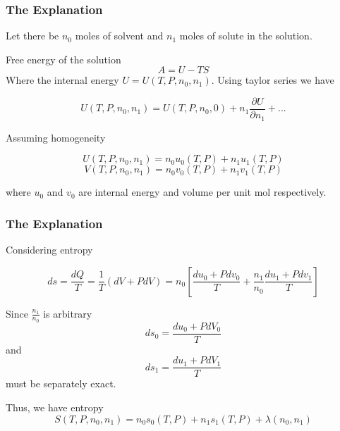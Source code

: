 \documentclass{beamer}
\begin{document}
		\begin{frame}
		\frametitle{The Explanation}
			Let there be $n_0$ moles of solvent and $n_1$ moles of solute in the solution.

			Free energy of the solution
			\begin{equation}
				A=U-TS
			\end{equation}
			Where the internal energy $U=U(T,P,n_0,n_1)$.
			Using taylor series we have

			\begin{equation}
				U(T,P,n_0,n_1)=U(T,P,n_0,0) + n_1 \frac {\partial U}{\partial n_1} + ...
			\end{equation}

			Assuming homogeneity

			\begin{equation}
				U(T,P,n_0,n_1) = n_0 u_0(T,P) + n_1 u_1(T,P)
			\end{equation}
			\begin{equation}
				V(T,P,n_0,n_1) = n_0 v_0 (T,P) + n_1 v_1 (T,P)
			\end{equation}

			where $u_0$ and $v_0$ are internal energy and volume per unit mol respectively.

		\end{frame}

		\begin{frame}
		\frametitle{The Explanation}
			Considering entropy

			\begin{equation}
				ds = \frac {dQ} {T} = \frac 1 T (dV + PdV)
				= n_0 \left[ \frac {du_0 + Pdv_0} {T}  + \frac {n_1} {n_0} \frac {du_1 + Pdv_1} {T} \right]
			\end{equation}
			
			Since $\frac {n_1} {n_0}$ is arbitrary
			\begin{equation}
				ds_0 = \frac {du_0 + PdV_0} {T}
			\end{equation}
			and
			\begin{equation}
				ds_1 = \frac {du_1 + PdV_1} {T}
			\end{equation}
			must be separately exact.

			Thus, we have entropy 
			\begin{equation}
				S(T,P,n_0,n_1) = n_0 s_0(T,P) + n_1 s_1 (T,P) + \lambda(n_0,n_1)
			\end{equation}
		\end{frame}
\end{document}
